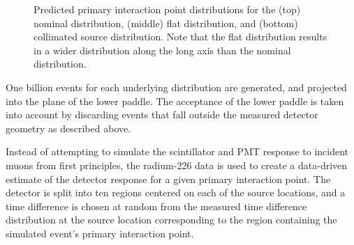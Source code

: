 \begin{figure}[htb]
\centering
{} 
\caption{\label{bah} Predicted primary interaction point distributions for the (top) nominal distribution, (middle) flat distribution, and (bottom) collimated source distribution. Note that the flat distribution results in a wider distribution along the long axis than the nominal distribution.  }
\end{figure}

One billion events for each underlying distribution are generated, and projected into the plane of the lower paddle. The acceptance of the lower paddle is taken into account by discarding events that fall outside the measured detector geometry as described above. 

Instead of attempting to simulate the scintillator and PMT response to incident muons from first principles, the radium-226 data is used to create a data-driven estimate of the detector response for a given primary interaction point. The detector is split into ten regions centered on each of the source locations, and a time difference is chosen at random from the measured time difference distribution at the source location corresponding to the region containing the simulated event's primary interaction point. 

